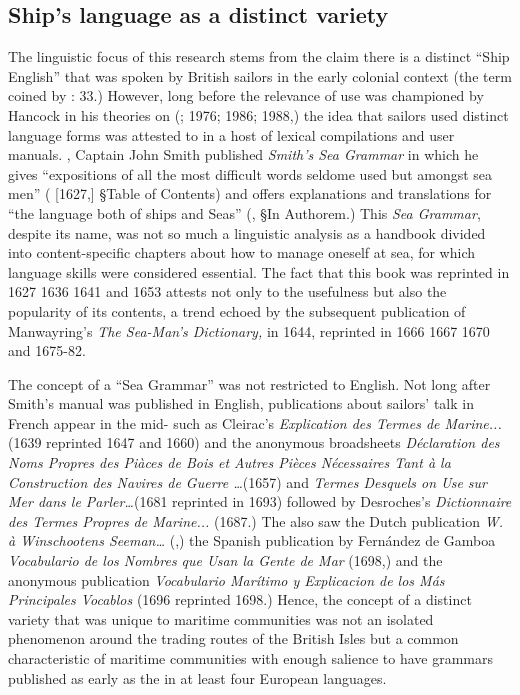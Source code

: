 \subsection{{Ship’s} {language} {as} {a} {distinct} {variety}}%



The linguistic focus of this research stems from the claim there is a distinct “Ship English” that was spoken by British sailors in the early colonial context (the term coined by \citealt{Hancock1976}: 33.) However, long before the relevance of  use was championed by Hancock in his theories on  (\citealt{Hancock1972}; 1976; 1986; 1988,) the idea that sailors used distinct language forms was attested to in a host of lexical compilations and user manuals. \citealt{In1627}, Captain John Smith published \textit{Smith’s Sea Grammar} in which he gives “expositions of all the most difficult words seldome used but amongst sea men” (\citealt{Smith1968} [1627,] §Table of Contents) and offers explanations and translations for “the language both of ships and Seas” (\citealt{Smith1968}, §In Authorem.) This \textit{Sea Grammar}, despite its name, was not so much a linguistic analysis as a handbook divided into content-specific chapters about how to manage oneself at sea, for which language skills were considered essential. The fact that this book was reprinted in 1627 1636 1641 and 1653 attests not only to the usefulness but also the popularity of its contents, a trend echoed by the subsequent publication of Manwayring’s \textit{The Sea-Man’s Dictionary,} in 1644, reprinted in 1666 1667 1670 and 1675-82. 



The concept of a “Sea Grammar” was not restricted to English. Not long after Smith’s manual was published in English, publications about sailors’ talk in French appear in the mid- such as Cleirac’s \textit{Explication des Termes de Marine...} (1639 reprinted 1647 and 1660) and the anonymous broadsheets \textit{Déclaration des Noms Propres des Piàces de Bois et Autres Pièces Nécessaires Tant à la Construction des Navires de Guerre …}(1657) and \textit{Termes Desquels on Use sur Mer dans le Parler…}(1681 reprinted in 1693) followed by Desroches’s \textit{Dictionnaire des Termes Propres de Marine...} (1687.) The  also saw the Dutch publication \textit{W. à Winschootens Seeman…} (\citealt{Winschooten1681},) the Spanish publication by Fernández de Gamboa \textit{Vocabulario de los Nombres que Usan la Gente de Mar} (1698,) and the anonymous publication \textit{Vocabulario Marítimo y Explicacion de los Más Principales Vocablos} (1696 reprinted 1698.) Hence, the concept of a distinct variety that was unique to maritime communities was not an isolated phenomenon around the trading routes of the British Isles but a common characteristic of maritime communities with enough salience to have grammars published as early as the  in at least four European languages. 




